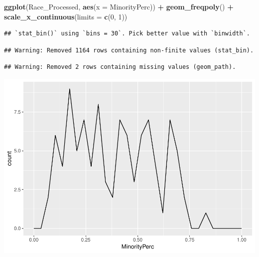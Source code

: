\documentclass[12pt,]{article}
\newenvironment{Shaded}{\begin{snugshade}}{\end{snugshade}}
\newcommand{\KeywordTok}[1]{\textcolor[rgb]{0.13,0.29,0.53}{\textbf{#1}}}
\newcommand{\DataTypeTok}[1]{\textcolor[rgb]{0.13,0.29,0.53}{#1}}
\newcommand{\DecValTok}[1]{\textcolor[rgb]{0.00,0.00,0.81}{#1}}
\newcommand{\StringTok}[1]{\textcolor[rgb]{0.31,0.60,0.02}{#1}}
\newcommand{\OperatorTok}[1]{\textcolor[rgb]{0.81,0.36,0.00}{\textbf{#1}}}
\newcommand{\NormalTok}[1]{#1}
\begin{document}
\begin{Shaded}
\begin{Highlighting}[]
\KeywordTok{ggplot}\NormalTok{(Race_Processed, }\KeywordTok{aes}\NormalTok{(}\DataTypeTok{x =}\NormalTok{ MinorityPerc)) }\OperatorTok{+}
\StringTok{  }\KeywordTok{geom_freqpoly}\NormalTok{() }\OperatorTok{+}
\StringTok{  }\KeywordTok{scale_x_continuous}\NormalTok{(}\DataTypeTok{limits =} \KeywordTok{c}\NormalTok{(}\DecValTok{0}\NormalTok{, }\DecValTok{1}\NormalTok{))}
\end{Highlighting}
\end{Shaded}

\begin{verbatim}
## `stat_bin()` using `bins = 30`. Pick better value with `binwidth`.
\end{verbatim}

\begin{verbatim}
## Warning: Removed 1164 rows containing non-finite values (stat_bin).
\end{verbatim}

\begin{verbatim}
## Warning: Removed 2 rows containing missing values (geom_path).
\end{verbatim}

\includegraphics{Project_Template_files/figure-latex/exploratory graphs-1.pdf}

\begin{Shaded}
\end{Shaded}
\end{document}
